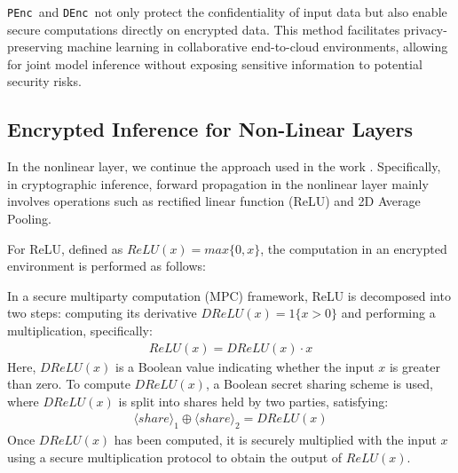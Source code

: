 \documentclass[conference]{IEEEtran}
\newcommand{\DEnc}{\texttt{DEnc}}
\newcommand{\PEnc}{\texttt{PEnc}}
\begin{document}
\PEnc~and \DEnc~not only protect the confidentiality of input data but also enable secure computations directly on encrypted data. This method facilitates privacy-preserving machine learning in collaborative end-to-cloud environments, allowing for joint model inference without exposing sensitive information to potential security risks.



\subsection{Encrypted Inference for Non-Linear Layers}

In the nonlinear layer, we continue the approach used in the work \cite{279898}. Specifically, in cryptographic inference, forward propagation in the nonlinear layer mainly involves operations such as rectified linear function (ReLU) and 2D Average Pooling.

 For ReLU, defined as $ReLU(x)=max\{0,x\}$, the computation in an encrypted environment is performed as follows:
 
 In a secure multiparty computation (MPC) framework, ReLU is decomposed into two steps: computing its derivative $DReLU(x)=1 \{x>0\}$ and performing a multiplication, specifically:
\begin{equation*}
\begin{array}{c}
       ReLU(x)=DReLU(x) \cdot x
\end{array}
\end{equation*}
Here, $DReLU(x)$ is a Boolean value indicating whether the input $x$ is greater than zero. To compute $DReLU(x)$, a Boolean secret sharing scheme is used, where $DReLU(x)$ is split into shares held by two parties, satisfying: 
\begin{equation*}
\begin{array}{c}
       \langle share\rangle_1\oplus\langle share\rangle_2=DReLU(x)
\end{array}
\end{equation*}
Once $DReLU(x)$ has been computed, it is securely multiplied with the input $x$ using a secure multiplication protocol to obtain the output of $ReLU(x)$.
\end{document}
